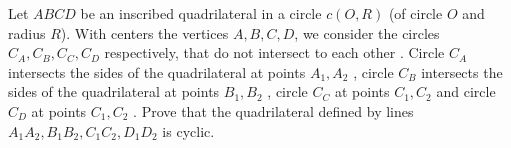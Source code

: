 Let $ABCD$ be an inscribed quadrilateral in a circle $c(O,R)$ (of circle $O$ and radius $R$). With centers the vertices $A,B,C,D$, we consider the circles  $C_{A},C_{B},C_{C},C_{D}$ respectively, that do not intersect to each other . Circle $C_{A}$ intersects the sides of the quadrilateral at points $A_{1} , A_{2}$ ,  circle $C_{B}$ intersects the sides of the quadrilateral at points $B_{1} , B_{2}$ , circle $C_{C}$ at points $C_{1} , C_{2}$ and circle $C_{D}$ at points $C_{1} , C_{2}$ . Prove that the quadrilateral defined by lines $A_{1}A_{2} , B_{1}B_{2} , C_{1}C_{2} , D_{1}D_{2}$ is cyclic.